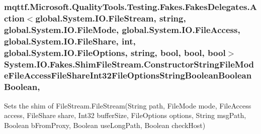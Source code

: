 \hypertarget{class_system_1_1_i_o_1_1_fakes_1_1_shim_file_stream_a6573bcfb60eb7c6c6882c1a2ec211803}{
\subsubsection[{Constructor\-String\-File\-Mode\-File\-Access\-File\-Share\-Int32\-File\-Options\-String\-Boolean\-Boolean\-Boolean}]{\setlength{\rightskip}{0pt plus 5cm}mqttf.\-Microsoft.\-Quality\-Tools.\-Testing.\-Fakes.\-Fakes\-Delegates.\-Action$<$global.\-System.\-I\-O.\-File\-Stream, string, global.\-System.\-I\-O.\-File\-Mode, global.\-System.\-I\-O.\-File\-Access, global.\-System.\-I\-O.\-File\-Share, int, global.\-System.\-I\-O.\-File\-Options, string, bool, bool, bool$>$ System.\-I\-O.\-Fakes.\-Shim\-File\-Stream.\-Constructor\-String\-File\-Mode\-File\-Access\-File\-Share\-Int32\-File\-Options\-String\-Boolean\-Boolean\-Boolean\hspace{0.3cm}{\ttfamily [static]}, {\ttfamily [set]}}}\label{class_system_1_1_i_o_1_1_fakes_1_1_shim_file_stream_a6573bcfb60eb7c6c6882c1a2ec211803}


Sets the shim of File\-Stream.\-File\-Stream(\-String path, File\-Mode mode, File\-Access access, File\-Share share, Int32 buffer\-Size, File\-Options options, String msg\-Path, Boolean b\-From\-Proxy, Boolean use\-Long\-Path, Boolean check\-Host)

